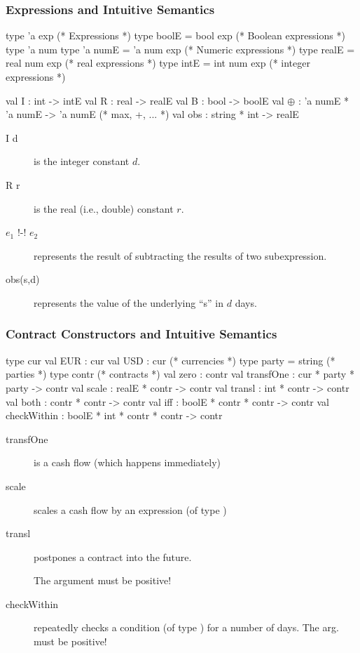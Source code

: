 \documentclass[xcolor=dvipsnames,11pt]{beamer}
\renewcommand{\emph}[1]{\textcolor{structure!60}{#1}}
\begin{document}
\begin{frame}[fragile,t]
    \frametitle{Expressions and Intuitive Semantics}

\begin{mlcode}
  type 'a exp                     (* Expressions          *)
  type boolE = bool exp           (* Boolean expressions  *)
  type 'a num 
  type 'a numE = 'a num exp       (* Numeric expressions  *)
  type realE = real num exp       (*  real expressions    *)
  type intE = int num exp         (*  integer expressions *)
 
  val I   : int -> intE
  val R   : real -> realE
  val B   : bool -> boolE
  val $\oplus$  : 'a numE * 'a numE -> 'a numE  (* max, +, ... *)
  val obs : string * int -> realE
\end{mlcode}

\begin{description}
\item[I d] is the integer constant $d$.
\item[R r] is the real (i.e., double) constant $r$.
\item[$e_1$ !-! $e_2$] represents the result of subtracting the results of two subexpression.
\item[obs(s,d)] represents the value of the underlying ``s'' in $d$ days.
\end{description}

\end{frame}

\begin{frame}[fragile,t]
    \frametitle{Contract Constructors and Intuitive Semantics}

\begin{mlcode}
  type cur val EUR : cur val USD : cur    (* currencies *)
  type party = string                     (* parties *)
  type contr                              (* contracts *)
  val zero        : contr             
  val transfOne   : cur * party * party -> contr
  val scale       : realE * contr -> contr
  val transl      : int * contr -> contr
  val both        : contr * contr -> contr
  val iff         : boolE * contr * contr -> contr
  val checkWithin : boolE * int * contr * contr -> contr
\end{mlcode}

\begin{description}
\item[transfOne] is a cash flow (which happens immediately)
\item[scale] scales a cash flow by an expression (of type )
\item[transl] postpones a contract into the \emph{future}.

    The  argument must be positive!

\item[checkWithin] repeatedly checks a condition (of type ) for a number of days.
    The  arg. must be positive!
\end{description}
\end{frame}
\end{document}
